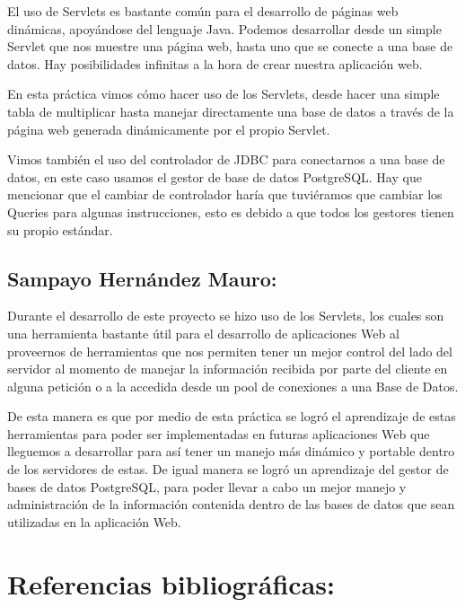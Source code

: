 \documentclass[titlepage, 12pt]{article}
\begin{document}
El uso de Servlets es bastante común para el desarrollo de páginas web dinámicas, apoyándose del lenguaje Java. Podemos desarrollar desde un simple Servlet que nos muestre una página web, hasta uno que se conecte a una base de datos. Hay posibilidades infinitas a la hora de crear nuestra aplicación web. \par\vspace{0.5cm}
En esta práctica vimos cómo hacer uso de los Servlets, desde hacer una simple tabla de multiplicar hasta manejar directamente una base de datos a través de la página web generada dinámicamente por el propio Servlet. \par\vspace{0.5cm}
Vimos también el uso del controlador de JDBC para conectarnos a una base de datos, en este caso usamos el gestor de base de datos PostgreSQL. Hay que mencionar que el cambiar de controlador haría que tuviéramos que cambiar los Queries para algunas instrucciones, esto es debido a que todos los gestores tienen su propio estándar.
\pagebreak
\subsection{Sampayo Hernández Mauro:}

Durante el desarrollo de este proyecto se hizo uso de los Servlets, los cuales son una herramienta bastante útil para el desarrollo de aplicaciones Web al proveernos de herramientas que nos permiten tener un mejor control del lado del servidor al momento de manejar la información recibida por parte del cliente en alguna petición o a la accedida desde un pool de conexiones a una Base de Datos. \par\vspace{0.5cm}
De esta manera es que por medio de esta práctica se logró el aprendizaje de estas herramientas para poder ser implementadas en futuras aplicaciones Web que lleguemos a desarrollar para así tener un manejo más dinámico y portable dentro de los servidores de estas. De igual manera se logró un aprendizaje del gestor de bases de datos PostgreSQL, para poder llevar a cabo un mejor manejo y administración de la información contenida dentro de las bases de datos que sean utilizadas en la aplicación Web.

\pagebreak

\section{Referencias bibliográficas:}
\end{document}
